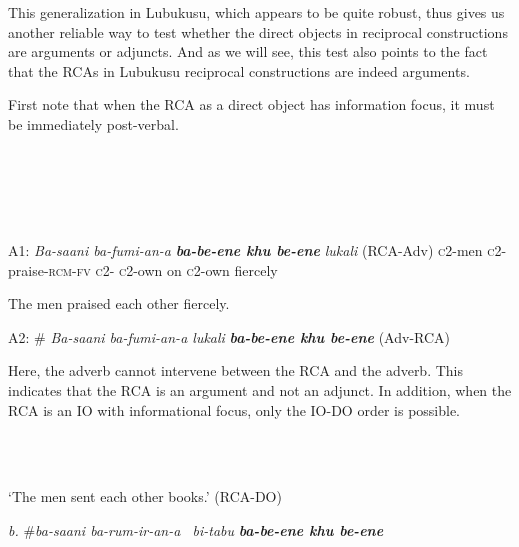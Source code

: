 \documentclass[output=paper]{langsci/langscibook}
\begin{document}
  This generalization in Lubukusu, which appears to be quite robust, thus gives us another reliable way to test whether the direct objects in reciprocal constructions are arguments or adjuncts. And as we will see, this test also points to the fact that the RCAs in Lubukusu reciprocal constructions are indeed  arguments.

First note that when the RCA as a direct object has information focus, it must be immediately post-verbal. 

\begin{listWWviiiNumxlileveli}
\item \ea\label{ex:}
\\
\ea\label{ex:}
\\
\ea\label{ex:}
\\
\ea\label{ex:}
\\
\end{listWWviiiNumxlileveli}

  A1:   \textit{Ba-saani ba-fumi-an-a      }\textbf{\textit{ba-be-ene    khu be-ene}}\textit{   lukali }   (RCA-Adv)      \textsc{c}2-men   \textsc{c}2-praise-\textsc{rcm-fv}       \textsc{c}2-\textsc{ c}2-own  on   \textsc{c}2-own  fiercely

    The men praised each other fiercely.

  A2:   \#\textit{ Ba-saani ba-fumi-an-a   lukali}\textbf{\textit{       ba-be-ene khu be-ene}}\textit{     }    (Adv-RCA)  

Here, the adverb cannot intervene between the RCA and the adverb. This indicates that the RCA is an argument and not an adjunct. In addition, when the RCA is an IO with informational focus, only the IO-DO order is possible.

\begin{listWWviiiNumxlileveli}
\item \ea\label{ex:}
\\
\ea\label{ex:}
\\
\end{listWWviiiNumxlileveli}
\setcounter{listWWviiiNumxixleveli}{0}
\begin{listWWviiiNumxixleveli}
\begin{styleExample}
    ‘The men sent each other books.’          (RCA-DO)
\end{styleExample}

\begin{styleExample}
  \textit{b.}  \#\textit{ba-saani   ba-rum-ir-an-a~  bi-tabu   }\textbf{\textit{ba-be-ene khu be-ene}} 
\end{styleExample}
\end{listWWviiiNumxixleveli}
\end{document}
